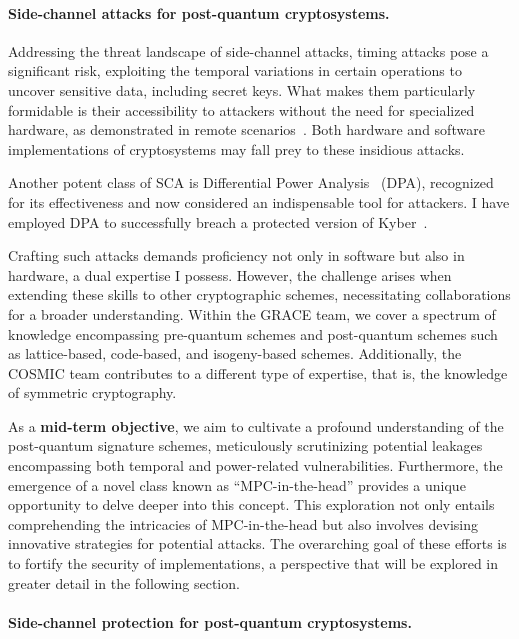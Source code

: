 \documentclass[11pt, a4paper]{article}
\begin{document}
\paragraph{Side-channel attacks for post-quantum cryptosystems.}\label{sec:attack}

Addressing the threat landscape of side-channel attacks, timing attacks pose a significant risk, exploiting the temporal variations in certain operations to uncover sensitive data, including secret keys. What makes them particularly formidable is their accessibility to attackers without the need for specialized hardware, as demonstrated in remote scenarios~\cite{brumley2005remote}. Both hardware and software implementations of cryptosystems may fall prey to these insidious attacks.

Another potent class of SCA is Differential Power Analysis~\cite{KocherJJR11} (DPA), recognized for its effectiveness and now considered an indispensable tool for attackers. I have employed DPA to successfully breach a protected version of Kyber~\cite{BockBBCPS23}.

Crafting such attacks demands proficiency not only in software but also in hardware, a dual expertise I possess. However, the challenge arises when extending these skills to other cryptographic schemes, necessitating collaborations for a broader understanding. Within the GRACE team, we cover a spectrum of knowledge encompassing pre-quantum schemes and post-quantum schemes such as lattice-based, code-based, and isogeny-based schemes. Additionally, the COSMIC team contributes to a different type of expertise, that is, the knowledge of symmetric cryptography.

As a \textbf{mid-term objective}, we aim to cultivate a profound understanding of the post-quantum signature schemes, meticulously scrutinizing potential leakages encompassing both temporal and power-related vulnerabilities. Furthermore, the emergence of a novel class known as ``MPC-in-the-head'' provides a unique opportunity to delve deeper into this concept. This exploration not only entails comprehending the intricacies of MPC-in-the-head but also involves devising innovative strategies for potential attacks. The overarching goal of these efforts is to fortify the security of implementations, a perspective that will be explored in greater detail in the following section.

\paragraph{Side-channel protection for post-quantum cryptosystems.}\label{sec:ct}
\end{document}
